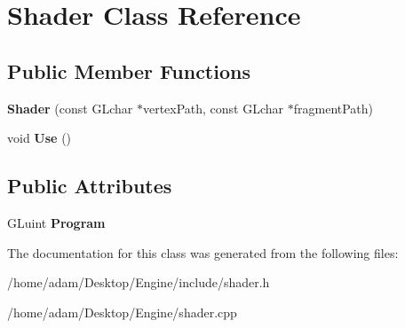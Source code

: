 \hypertarget{classShader}{}\section{Shader Class Reference}
\label{classShader}
\subsection*{Public Member Functions}
\begin{DoxyCompactItemize}
\item 
\mbox{\label{classShader_a03421a8419cdad4b84cf58ecdb156879}} 
{\bfseries Shader} (const G\+Lchar $\ast$vertex\+Path, const G\+Lchar $\ast$fragment\+Path)
\item 
\mbox{\label{classShader_a6b11327cff651ffdb22988b6917b1650}} 
void {\bfseries Use} ()
\end{DoxyCompactItemize}
\subsection*{Public Attributes}
\begin{DoxyCompactItemize}
\item 
\mbox{\label{classShader_a51b23253846bc84dcc2ef06612679012}} 
G\+Luint {\bfseries Program}
\end{DoxyCompactItemize}


The documentation for this class was generated from the following files\+:\begin{DoxyCompactItemize}
\item 
/home/adam/\+Desktop/\+Engine/include/shader.\+h\item 
/home/adam/\+Desktop/\+Engine/shader.\+cpp\end{DoxyCompactItemize}
